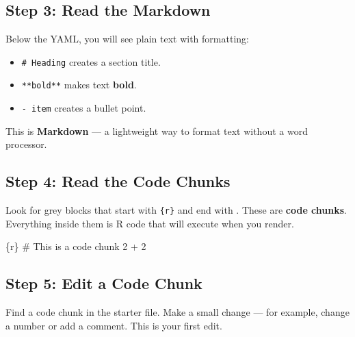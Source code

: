 \documentclass[
  letterpaper,
  DIV=11,
  numbers=noendperiod,
  oneside]{scrreprt}
\newenvironment{Shaded}{\begin{snugshade}}{\end{snugshade}}
\newcommand{\CommentTok}[1]{\textcolor[rgb]{0.37,0.37,0.37}{#1}}
\newcommand{\DecValTok}[1]{\textcolor[rgb]{0.68,0.00,0.00}{#1}}
\newcommand{\InformationTok}[1]{\textcolor[rgb]{0.37,0.37,0.37}{#1}}
\newcommand{\SpecialCharTok}[1]{\textcolor[rgb]{0.37,0.37,0.37}{#1}}
\providecommand{\tightlist}{%
  \setlength{\itemsep}{0pt}\setlength{\parskip}{0pt}}
\begin{document}
\subsection*{Step 3: Read the Markdown}\label{step-3-read-the-markdown}

Below the YAML, you will see plain text with formatting:

\begin{itemize}
\tightlist
\item
  \texttt{\#\ Heading} creates a section title.
\item
  \texttt{**bold**} makes text \textbf{bold}.
\item
  \texttt{-\ item} creates a bullet point.
\end{itemize}

This is \textbf{Markdown} --- a lightweight way to format text without a
word processor.

\subsection*{Step 4: Read the Code
Chunks}\label{step-4-read-the-code-chunks}

Look for grey blocks that start with
\texttt{\textasciigrave{}\textasciigrave{}\textasciigrave{}\{r\}} and
end with \texttt{\textasciigrave{}\textasciigrave{}\textasciigrave{}}.
These are \textbf{code chunks}. Everything inside them is R code that
will execute when you render.

\begin{Shaded}
\begin{Highlighting}[numbers=left,,]
\InformationTok{\textasciigrave{}\textasciigrave{}\textasciigrave{}\{r\}}
\CommentTok{\# This is a code chunk}
\DecValTok{2} \SpecialCharTok{+} \DecValTok{2}
\InformationTok{\textasciigrave{}\textasciigrave{}\textasciigrave{}}
\end{Highlighting}
\end{Shaded}

\subsection*{Step 5: Edit a Code Chunk}\label{step-5-edit-a-code-chunk}

Find a code chunk in the starter file. Make a small change --- for
example, change a number or add a comment. This is your first edit.
\end{document}
